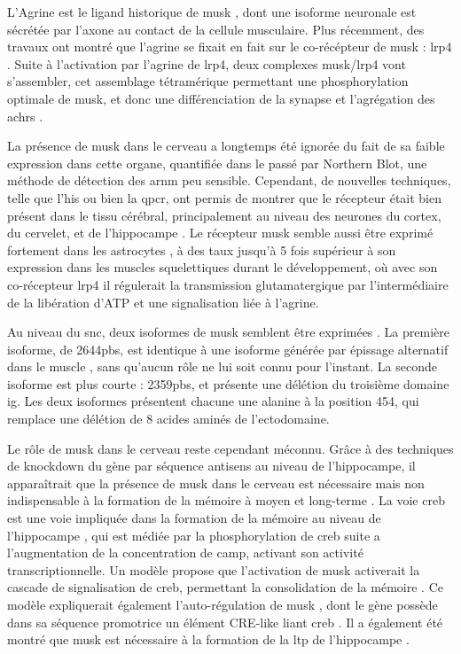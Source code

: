 	L'Agrine est le ligand historique de \gls{musk} \cite{Glass1996}, dont une isoforme neuronale est sécrétée par l'axone au contact de la cellule musculaire. Plus récemment, des travaux ont montré que l'agrine se fixait en fait sur le co-récépteur de \gls{musk} : \gls{lrp}4 \cite{Zhang2008,Kim2008}. Suite à l'activation par l'agrine de \acrshort{lrp}4, deux complexes \gls{musk}/\gls{lrp}4 vont s'assembler, cet assemblage tétramérique permettant une phosphorylation optimale de \gls{musk}, et donc une différenciation de la synapse et l'agrégation des \glspl{achr} \cite{Zong2012}.
	
	La présence de \gls{musk} dans le cerveau a longtemps été ignorée du fait de sa faible expression dans cette organe, quantifiée dans le passé par Northern Blot, une méthode de détection des \acrshort{arnm} peu sensible. Cependant, de nouvelles techniques, telle que l'\gls{his} ou bien la \gls{qpcr}, ont permis de montrer que le récepteur était bien présent dans le tissu cérébral, principalement au niveau des neurones du cortex, du cervelet, et de l'hippocampe \cite{Garcia-Osta2006, Ksiazek2007}. Le récepteur \gls{musk} semble aussi être exprimé fortement dans les astrocytes \cite{Sun2016}, à des taux jusqu'à 5 fois supérieur à son expression dans les muscles squelettiques durant le développement, où avec son co-récepteur \gls{lrp}4 il régulerait la transmission glutamatergique par l'intermédiaire de la libération d'ATP et une signalisation liée à l'agrine.
	
	Au niveau du \gls{snc}, deux isoformes de \gls{musk} semblent être exprimées \cite{Garcia-Osta2006}. La première isoforme, de 2644pbs, est identique à une isoforme générée par épissage alternatif dans le muscle \cite{Valenzuela1995}, sans qu'aucun rôle ne lui soit connu pour l'instant. La seconde isoforme est plus courte : 2359pbs, et présente une délétion du troisième domaine \gls{ig}. Les deux isoformes présentent chacune une alanine à la position 454, qui remplace une délétion de 8 acides aminés de l'ectodomaine. 
	
	Le rôle de \gls{musk} dans le cerveau reste cependant méconnu. Grâce à des techniques de knockdown du gène par séquence antisens au niveau de l'hippocampe, il apparaîtrait que la présence de \gls{musk} dans le cerveau est nécessaire mais non indispensable à la formation de la mémoire à moyen et long-terme \cite{Garcia-Osta2006}. La voie \gls{creb} est une voie impliquée dans la formation de la mémoire au niveau de l'hippocampe \cite{Silva1998, Kandel2012,Kida2014,Ortega-Martinez2015}, qui est médiée par la phosphorylation de \gls{creb} suite a l'augmentation de la concentration de \acrshort{camp}, activant son activité transcriptionnelle. Un modèle propose que l'activation de \gls{musk} activerait la cascade de signalisation de \gls{creb}, permettant la consolidation de la mémoire \cite{Garcia-Osta2006}. Ce modèle expliquerait également l'auto-régulation de \gls{musk} \cite{Moore2001}, dont le gène possède dans sa séquence promotrice un élément CRE-like liant \gls{creb} \cite{Kim2005}. Il a également été montré que \gls{musk} est nécessaire à la formation de la \gls{ltp} de l'hippocampe \cite{Garcia-Osta2006}.

